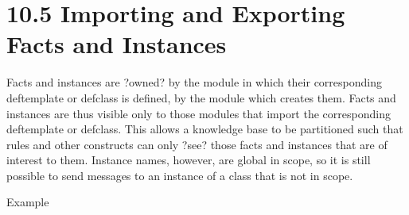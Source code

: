 \documentclass[letterpaper,10pt,english]{sphinxmanual}
\begin{document}
\section{10.5 Importing and Exporting Facts and Instances}
\label{\detokenize{defmodule:importing-and-exporting-facts-and-instances}}
Facts and instances are ?owned? by the module in which their
corresponding deftemplate or defclass is defined,  by the module
which creates them. Facts and instances are thus visible only to those
modules that import the corresponding deftemplate or defclass. This
allows a knowledge base to be partitioned such that rules and other
constructs can only ?see? those facts and instances that are of interest
to them. Instance names, however, are global in scope, so it is still
possible to send messages to an instance of a class that is not in
scope.

Example

\begin{sphinxVerbatim}[commandchars=\\\{\}]
 
      
    
    
        
      
 
  
   
   
     
  
   
     
\end{sphinxVerbatim}
\end{document}
